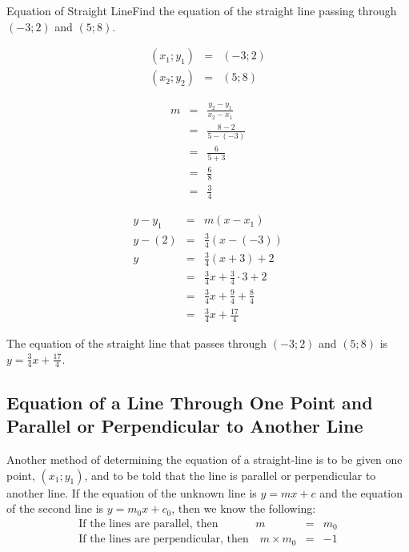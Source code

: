 \begin{wex}{Equation of Straight Line}{Find the equation of the straight line passing through $(-3;2)$ and $(5;8)$.\\}{
\begin{eqnarray*}
(x_1;y_1)&=&(-3;2)\\
(x_2;y_2)&=&(5;8)
\end{eqnarray*}

\begin{eqnarray*}
m &=&\frac{y_2-y_1}{x_2-x_1}\\
&=&\frac{8-2}{5-(-3)}\\
&=&\frac{6}{5+3}\\
&=&\frac{6}{8}\\
&=&\frac{3}{4}
\end{eqnarray*}

\begin{eqnarray*}
y-y_1&=&m(x-x_1)\\
y-(2)&=&\frac{3}{4}(x-(-3))\\
y&=&\frac{3}{4}(x+3) + 2\\
&=&\frac{3}{4}x + \frac{3}{4} \cdot 3 + 2\\
&=&\frac{3}{4}x + \frac{9}{4} + \frac{8}{4}\\
&=&\frac{3}{4}x + \frac{17}{4}
\end{eqnarray*}

The equation of the straight line that passes through $(-3;2)$ and $(5;8)$ is $y=\frac{3}{4}x + \frac{17}{4}$.}
\end{wex}

\subsection{Equation of a Line Through One Point and Parallel or Perpendicular to Another Line}

Another method of determining the equation of a straight-line is to be given one point, $(x_1;y_1)$, and to be told that the line is parallel or perpendicular to another line. If the equation of the unknown line is $y=mx+c$ and the equation of the second line is $y=m_0x+c_0$, then we know the following:
\begin{eqnarray}
\mbox{If the lines are parallel, then }\quad\quad\quad m&=& m_0\\
\mbox{If the lines are perpendicular, then}\quad m \times m_0&=& -1
\end{eqnarray}

